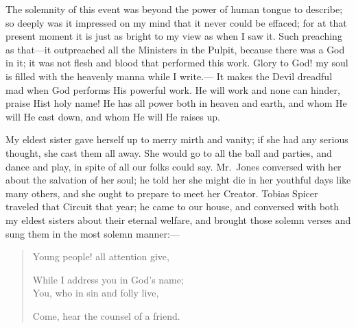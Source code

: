 \documentclass{article}
\renewcommand\footnote[1]{} %
\begin{document}
The solemnity of this event was beyond the power of human tongue to describe; so deeply was it impressed on my mind that it never could be effaced; for at that present moment it is just as bright to my view as when I saw it.
Such preaching as that---it outpreached all the Ministers in the Pulpit, because there was a God in it; it was not flesh and blood that performed this work.
Glory to God! my soul is filled with the heavenly manna while I write.---
It makes the Devil dreadful mad when God performs His powerful work.
He will work and none can hinder, praise Hist holy name!
He has all power both in heaven and earth, and whom He will He cast down, and whom He will He raises up.

My eldest sister\footnote{Harriet} gave herself up to merry mirth and vanity; if she had any serious thought, she cast them all away.
She would go to all the ball and parties, and dance and play, in spite of all our folks could say.
Mr.\ Jones conversed with her about the salvation of her soul; he told her she might die in her youthful days like many others, and she ought to prepare to meet her Creator.
Tobias Spicer traveled that Circuit that year; he came to our house, and conversed with both my eldest sisters about their eternal welfare, and brought those solemn verses and sung them in the most solemn manner:---
\begin{quote}
\setlength{\parindent}{2ex}
    Young people! all attention give,
    \setlength{\parskip}{0pt}
    \par While I address you in God's name;\\
    You, who in sin and folly live,
    \par Come, hear the counsel of a friend.
\end{quote}
\end{document}
